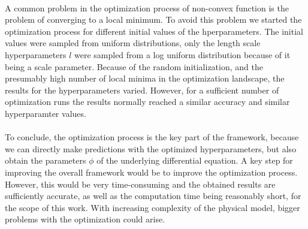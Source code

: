 \documentclass{article}
\begin{document}
\\
A common problem in the optimization process of non-convex function is the problem of converging to a local minimum. To avoid this problem we started the optimization process for different initial values of the hperparameters. The initial values were sampled from uniform distributions, only the length scale hyperparameters $l$ were sampled from a log uniform distribution because of it being a scale parameter. Because of the random initialization, and the presumably high number of local minima in the optimization landscape, the results for the hyperparameters varied. However, for a sufficient number of optimization runs the results normally reached a similar accuracy and similar hyperparamter values. \\
\\
To conclude, the optimization process is the key part of the framework, because we can directly make predictions with the optimized hyperparameters, but also obtain the parameters $\phi$ of the underlying differential equation. A key step for improving the overall framework would be to improve the optimization process. However, this would be very time-consuming and the obtained results are sufficiently accurate, as well as the computation time being reasonably short, for the scope of this work. With increasing complexity of the physical model, bigger problems with the optimization could arise.\\
\end{document}
